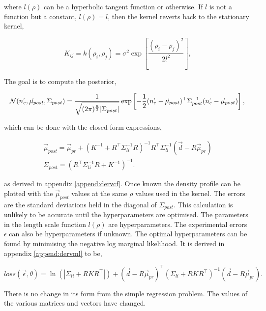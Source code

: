 \noindent where $l(\rho)$ can be a hyperbolic tangent function or otherwise. If $l$ is not a function but a constant, $l(\rho) = l$, then the kernel reverts back to the stationary kernel,

\begin{equation}
K_{ij} = k(\rho_i, \rho_j) = \sigma^2 \exp\left[{\frac{(\rho_i - \rho_j)^2}{2l^2}}\right],
\end{equation}
  
\noindent The goal is to compute the posterior,

\begin{equation}
\mathcal{N}(\vec{n_e}, \vec{\mu}_{post}, \Sigma_{post}) = \frac{1}{\sqrt{(2\pi)^{\frac{n}{2}}|\Sigma_{post}|}} \exp \left[{{-\frac{1}{2}(\vec{n_e}-\vec{\mu}_{post})^\top\Sigma_{post}^{-1}(\vec{n_e}-\vec{\mu}_{post})}}\right],\\
\end{equation}

\noindent which can be done with the closed form expressions,

\begin{gather}
    \vec{\mu}_{post}= \vec{\mu}_{pr} + (K^{-1} + R^{\top} \Sigma_{li}^{-1} R)^{-1} R^{\top} \Sigma_{li}^{-1} (\vec{d} - R \vec{\mu}_{pr})\\
    \Sigma_{post} = \left(R^\top \Sigma_{li}^{-1} R + K^{-1}\right)^{-1}.
\end{gather}

\noindent as derived in appendix \ref{append:dervcf}. Once known the density profile can be plotted with the $\vec{\mu}_{post}$ values at the same $\rho$ values used in the kernel. The errors are the standard deviations held in the diagonal of $\Sigma_{post}$. This calculation is unlikely to be accurate until the hyperparameters are optimised. The parameters in the length scale function $l(\rho)$ are hyperparameters. The experimental errors $\epsilon$ can also be hyperparameters if unknown. The optimal hyperparameters can be found by minimising the negative log marginal likelihood. It is derived in appendix \ref{append:dervml} to be, 

\begin{equation}
loss(\vec \epsilon,\theta) = \ln(|\Sigma_{li}+RKR^\top|) + (\vec{d} - R\vec{\mu}_{pr})^{\top} (\Sigma_{li} + R K R^{\top})^{-1} (\vec{d} - R\vec{\mu}_{pr}).
\end{equation}

\noindent There is no change in its form from the simple regression problem. The values of the various matrices and vectors have changed. 

